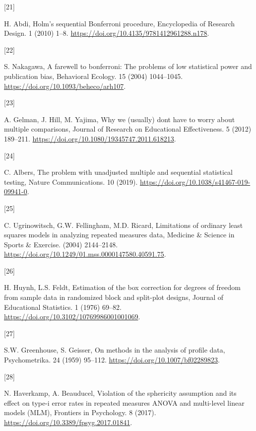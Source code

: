 \documentclass[
]{article}
\newlength{\cslhangindent}
\newlength{\csllabelwidth}
\newlength{\cslentryspacingunit} %
\newenvironment{CSLReferences}[2] %
 {%
  \setlength{\parindent}{0pt}
  \ifodd #1
  \let\oldpar\par
  \def\par{\hangindent=\cslhangindent\oldpar}
  \fi
  \setlength{\parskip}{#2\cslentryspacingunit}
 }%
 {}
\newcommand{\CSLLeftMargin}[1]{\parbox[t]{\csllabelwidth}{#1}}
\newcommand{\CSLRightInline}[1]{\parbox[t]{\linewidth - \csllabelwidth}{#1}\break}
\begin{document}
\begin{CSLReferences}{0}{0}
\leavevmode{}%
\CSLLeftMargin{{[}21{]} }
\CSLRightInline{H. Abdi, {Holm's sequential Bonferroni procedure}, Encyclopedia of Research Design. 1 (2010) 1--8. \url{https://doi.org/10.4135/9781412961288.n178}.}

\leavevmode{}%
\CSLLeftMargin{{[}22{]} }
\CSLRightInline{S. Nakagawa, A farewell to bonferroni: The problems of low statistical power and publication bias, Behavioral Ecology. 15 (2004) 1044--1045. \url{https://doi.org/10.1093/beheco/arh107}.}

\leavevmode{}%
\CSLLeftMargin{{[}23{]} }
\CSLRightInline{A. Gelman, J. Hill, M. Yajima, Why we (usually) don{\textquotesingle}t have to worry about multiple comparisons, Journal of Research on Educational Effectiveness. 5 (2012) 189--211. \url{https://doi.org/10.1080/19345747.2011.618213}.}

\leavevmode{}%
\CSLLeftMargin{{[}24{]} }
\CSLRightInline{C. Albers, The problem with unadjusted multiple and sequential statistical testing, Nature Communications. 10 (2019). \url{https://doi.org/10.1038/s41467-019-09941-0}.}

\leavevmode{}%
\CSLLeftMargin{{[}25{]} }
\CSLRightInline{C. Ugrinowitsch, G.W. Fellingham, M.D. Ricard, Limitations of ordinary least squares models in analyzing repeated measures data, Medicine {\&} Science in Sports {\&} Exercise. (2004) 2144--2148. \url{https://doi.org/10.1249/01.mss.0000147580.40591.75}.}

\leavevmode{}%
\CSLLeftMargin{{[}26{]} }
\CSLRightInline{H. Huynh, L.S. Feldt, Estimation of the box correction for degrees of freedom from sample data in randomized block and split-plot designs, Journal of Educational Statistics. 1 (1976) 69--82. \url{https://doi.org/10.3102/10769986001001069}.}

\leavevmode{}%
\CSLLeftMargin{{[}27{]} }
\CSLRightInline{S.W. Greenhouse, S. Geisser, On methods in the analysis of profile data, Psychometrika. 24 (1959) 95--112. \url{https://doi.org/10.1007/bf02289823}.}

\leavevmode{}%
\CSLLeftMargin{{[}28{]} }
\CSLRightInline{N. Haverkamp, A. Beauducel, Violation of the sphericity assumption and its effect on type-i error rates in repeated measures {ANOVA} and multi-level linear models ({MLM}), Frontiers in Psychology. 8 (2017). \url{https://doi.org/10.3389/fpsyg.2017.01841}.}


\end{CSLReferences}
\end{document}
